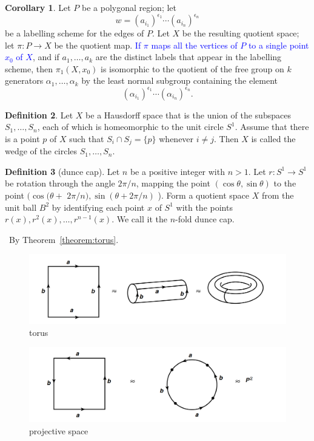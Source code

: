 \documentclass[12pt,a4paper]{book}
\newenvironment{prooff}{{\noindent\it\textcolor{cyan!40!black}{Proof}:}\,}{\par}
\newcommand{\blue}[1]{\textcolor{blue}{#1}}
\theoremstyle{definition}
\newtheorem{defn}{Definition}[section]
\newtheorem{coro}[defn]{Corollary}
\begin{document}
\begin{coro}
    Let $P$ be a polygonal region; let
    $$
        w=\left(a_{i_1}\right)^{\epsilon_1} \cdots\left(a_{i_n}\right)^{\epsilon_n}
    $$
    be a labelling scheme for the edges of $P$. Let $X$ be the resulting quotient space; let $\pi: P \rightarrow X$ be the quotient map.
    \blue{If $\pi$ maps all the vertices of $P$ to a single point $x_0$ of $X$}, and if $a_1, \ldots, a_k$ are the distinct labels that appear in the labelling scheme, then $\pi_1\left(X, x_0\right)$ is isomorphic to the quotient of the free group on $k$ generators $\alpha_1, \ldots, \alpha_k$ by the least normal subgroup containing the element
    $$
        \left(\alpha_{i_1}\right)^{\epsilon_1} \cdots\left(\alpha_{i_n}\right)^{\epsilon_n} .
    $$
\end{coro}
\begin{defn}
    Let $X$ be a Hausdorff space that is the union of the subspaces $S_1, \ldots, S_n$, each of which is homeomorphic to the unit circle $S^1$. Assume that there is a point $p$ of $X$ such that $S_i \cap S_j=\{p\}$ whenever $i \neq j$. Then $X$ is called the wedge of the circles $S_1, \ldots, S_n$.
\end{defn}
\begin{defn}[dunce cap]
    Let $n$ be a positive integer with $n>1$.
    Let $r: S^1 \rightarrow S^1$ be rotation through the angle $2 \pi / n$,
    mapping the point $(\cos \theta, \sin \theta)$ to the point $(\cos (\theta+$ $2 \pi / n), \sin (\theta+2 \pi / n)$ ).
    Form a quotient space $X$ from the unit ball $B^2$ by identifying each point $x$ of $S^1$ with the points $r(x), r^2(x), \ldots, r^{n-1}(x)$.
    We call it the $n$-fold dunce cap.
\end{defn}
\begin{prooff}
    By Theorem~\ref{theorem:torus}.
\end{prooff}
\begin{figure}[H]
    \includegraphics[scale=0.7]{torus2.png}
    \caption{torus}
    \centering
\end{figure}
\begin{figure}[H]
    \includegraphics[scale=0.7]{proj1.png}
    \centering
    \caption{projective space}
\end{figure}
\end{document}
